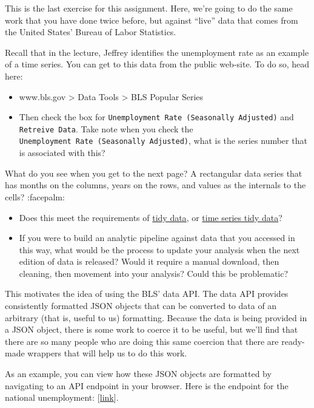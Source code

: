 \documentclass[
]{article}
\providecommand{\tightlist}{%
  \setlength{\itemsep}{0pt}\setlength{\parskip}{0pt}}
\begin{document}
This is the last exercise for this assignment. Here, we're going to do
the same work that you have done twice before, but against ``live'' data
that comes from the United States' Bureau of Labor Statistics.

Recall that in the lecture, Jeffrey identifies the unemployment rate as
an example of a time series. You can get to this data from the public
web-site. To do so, head here:

\begin{itemize}
\tightlist
\item
  www.bls.gov \textgreater{} Data Tools \textgreater{} BLS Popular
  Series
\item
  Then check the box for
  \texttt{Unemployment\ Rate\ (Seasonally\ Adjusted)} and
  \texttt{Retreive\ Data}. Take note when you check the
  \texttt{Unemployment\ Rate\ (Seasonally\ Adjusted)}, what is the
  series number that is associated with this?
\end{itemize}

What do you see when you get to the next page? A rectangular data series
that has months on the columns, years on the rows, and values as the
internals to the cells? :facepalm:

\begin{itemize}
\tightlist
\item
  Does this meet the requirements of
  \href{https://r4ds.had.co.nz/tidy-data.html}{tidy data}, or
  \href{https://tsibble.tidyverts.org}{time series tidy data}?
\item
  If you were to build an analytic pipeline against data that you
  accessed in this way, what would be the process to update your
  analysis when the next edition of data is released? Would it require a
  manual download, then cleaning, then movement into your analysis?
  Could this be problematic?
\end{itemize}

This motivates the idea of using the BLS' data API. The data API
provides consistently formatted JSON objects that can be converted to
data of an arbitrary (that is, useful to us) formatting. Because the
data is being provided in a JSON object, there is some work to coerce it
to be useful, but we'll find that there are so many people who are doing
this same coercion that there are ready-made wrappers that will help us
to do this work.

As an example, you can view how these JSON objects are formatted by
navigating to an API endpoint in your browser. Here is the endpoint for
the national unemployment:
{[}\href{https://api.bls.gov/publicAPI/v2/timeseries/data/LNS14000000}{link}{]}.
\end{document}
